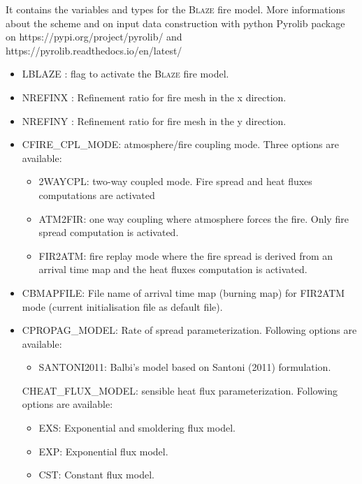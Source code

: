 It contains the variables and types for the \textsc{Blaze} fire model. More informations about the scheme and on input data construction with python Pyrolib package on https://pypi.org/project/pyrolib/ and https://pyrolib.readthedocs.io/en/latest/ 

\begin{itemize}
	\item 
	LBLAZE : flag to activate the \textsc{Blaze} fire model.
	\item 
	NREFINX : Refinement ratio for fire mesh in the x direction.
	\item 
	NREFINY : Refinement ratio for fire mesh in the y direction.
	\item 
	CFIRE\_CPL\_MODE: atmosphere/fire coupling mode. Three options are available:
	\begin{itemize}
		\item 2WAYCPL: two-way coupled mode. Fire spread and heat fluxes computations are activated
		\item ATM2FIR: one way coupling where atmosphere forces the fire. Only fire spread computation is activated.
		\item FIR2ATM: fire replay mode where the fire spread is derived from an arrival time map and the heat fluxes computation is activated.
	\end{itemize}
	\item 
	CBMAPFILE: File name of arrival time map (burning map) for FIR2ATM mode (current initialisation file as default file).
	\item 
	CPROPAG\_MODEL: Rate of spread parameterization. Following options are available:
	\begin{itemize}
		\item SANTONI2011: Balbi's model based on Santoni (2011) formulation.
	\end{itemize}
	CHEAT\_FLUX\_MODEL: sensible heat flux parameterization. Following options are available:
	\begin{itemize}
		\item EXS: Exponential and smoldering flux model. 
		\item EXP: Exponential flux model.
		\item CST: Constant flux model.
	\end{itemize}

\end{itemize}
